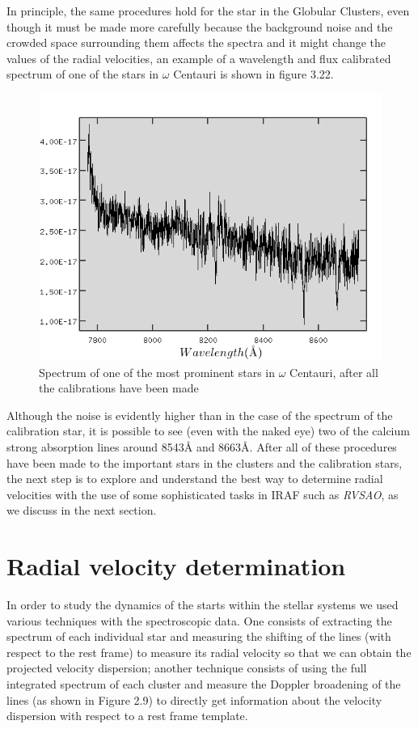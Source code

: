 In principle, the same procedures hold for the star in the Globular Clusters, even though it must be made more carefully because the background noise and the crowded space surrounding them affects the spectra and it might change the values of the radial velocities, an example of a wavelength and flux calibrated spectrum of one of the stars in $\omega$ Centauri is shown in figure 3.22.

\begin{figure}[H]
\centering
\includegraphics[width=12cm]{images/cluster_star_flux.png}
\caption[Spectrum of a prominent star of the NGC5139 globular cluster]{Spectrum of one of the most prominent stars in $\omega$ Centauri, after all the calibrations have been made}
\end{figure}

Although the noise is evidently higher than in the case of the spectrum of the calibration star, it is possible to see (even with the naked eye) two of the calcium strong absorption lines around 8543\AA$ $ and 8663\AA. After all of these procedures have been made to the important stars in the clusters and the calibration stars, the next step is to explore and understand the best way to determine radial velocities with the use of some sophisticated tasks in IRAF such as \textit{RVSAO}, as we discuss in the next section. 

\section{Radial velocity determination}

In order to study the dynamics of the starts within the stellar systems we used various techniques with the spectroscopic data. One consists of extracting the spectrum of each individual star and measuring the shifting of the lines (with respect to the rest frame) to measure its radial velocity so that we can obtain the projected velocity dispersion; another technique consists of using the full integrated spectrum of each cluster and measure the Doppler broadening of the lines (as shown in Figure 2.9) to directly get information about the velocity dispersion with respect to a rest frame template. 

